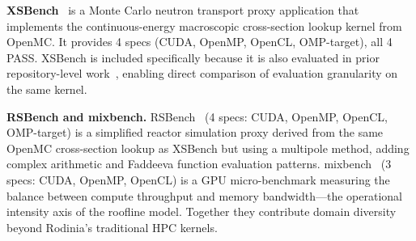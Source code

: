 \documentclass{article}
\begin{document}


\textbf{XSBench}~\cite{XSBench2014} is a Monte Carlo neutron transport proxy application that implements the continuous-energy macroscopic cross-section lookup kernel from OpenMC. It provides 4 specs (CUDA, OpenMP, OpenCL, OMP-target), all 4 PASS. XSBench is included specifically because it is also evaluated in prior repository-level work~\cite{ParEvalRepo2025}, enabling direct comparison of evaluation granularity on the same kernel.

\textbf{RSBench and mixbench.} RSBench~\cite{RSBench2014} (4 specs: CUDA, OpenMP, OpenCL, OMP-target) is a simplified reactor simulation proxy derived from the same OpenMC cross-section lookup as XSBench but using a multipole method, adding complex arithmetic and Faddeeva function evaluation patterns. mixbench~\cite{mixbench2017} (3 specs: CUDA, OpenMP, OpenCL) is a GPU micro-benchmark measuring the balance between compute throughput and memory bandwidth---the operational intensity axis of the roofline model. Together they contribute domain diversity beyond Rodinia's traditional HPC kernels.


\end{document}
